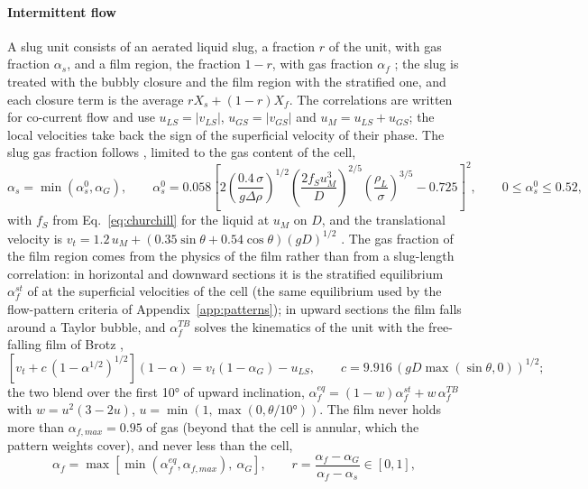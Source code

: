 \documentclass[a4paper,fleqn]{cas-sc}
\newcommand{\aG}{\alpha_G}
\begin{document}
\paragraph{Intermittent flow} A slug unit consists of an aerated liquid slug, a fraction $r$ of the unit, with gas fraction $\alpha_s$, and a film region, the fraction $1 - r$, with gas fraction $\alpha_f$ \citep{taitel1990b}; the slug is treated with the bubbly closure and the film region with the stratified one, and each closure term is the average $r X_s + (1 - r) X_f$. The correlations are written for co-current flow and use $u_{LS} = |v_{LS}|$, $u_{GS} = |v_{GS}|$ and $u_M = u_{LS} + u_{GS}$; the local velocities take back the sign of the superficial velocity of their phase. The slug gas fraction follows \citet{barnea1985}, limited to the gas content of the cell,
\begin{equation}
\alpha_s = \min(\alpha_s^0, \aG), \qquad \alpha_s^0 = 0.058\left[2\left(\frac{0.4\,\sigma}{g\Delta\rho}\right)^{1/2}\left(\frac{2 f_S u_M^3}{D}\right)^{2/5}\left(\frac{\rho_L}{\sigma}\right)^{3/5} - 0.725\right]^2, \qquad 0 \le \alpha_s^0 \le 0.52,
\end{equation}
with $f_S$ from Eq.~\eqref{eq:churchill} for the liquid at $u_M$ on $D$, and the translational velocity is $v_t = 1.2\,u_M + (0.35\sin\theta + 0.54\cos\theta)(gD)^{1/2}$ \citep{bendiksen1984}. The gas fraction of the film region comes from the physics of the film rather than from a slug-length correlation: in horizontal and downward sections it is the stratified equilibrium $\alpha_f^{st}$ of \citet{taitel1976} at the superficial velocities of the cell (the same equilibrium used by the flow-pattern criteria of Appendix~\ref{app:patterns}); in upward sections the film falls around a Taylor bubble, and $\alpha_f^{TB}$ solves the kinematics of the unit with the free-falling film of Brotz \citep{taitel1980},
\begin{equation}
\left[v_t + c\,(1 - \alpha^{1/2})^{1/2}\right](1 - \alpha) = v_t(1 - \aG) - u_{LS}, \qquad c = 9.916\,(g D\max(\sin\theta, 0))^{1/2};
\end{equation}
the two blend over the first \ang{10} of upward inclination, $\alpha_f^{eq} = (1 - w)\alpha_f^{st} + w\,\alpha_f^{TB}$ with $w = u^2(3 - 2u)$, $u = \min(1, \max(0, \theta/\ang{10}))$. The film never holds more than $\alpha_{f,max} = 0.95$ of gas (beyond that the cell is annular, which the pattern weights cover), and never less than the cell,
\begin{equation}
\alpha_f = \max\left[\min(\alpha_f^{eq}, \alpha_{f,max}),\ \aG\right], \qquad r = \frac{\alpha_f - \aG}{\alpha_f - \alpha_s} \in [0, 1],
\end{equation}
\end{document}
